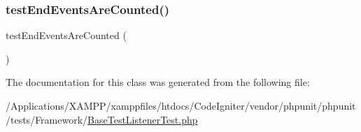 \subsubsection{\texorpdfstring{test\+End\+Events\+Are\+Counted()}{testEndEventsAreCounted()}}
{\footnotesize\ttfamily test\+End\+Events\+Are\+Counted (\begin{DoxyParamCaption}{ }\end{DoxyParamCaption})}



The documentation for this class was generated from the following file\+:\begin{DoxyCompactItemize}
\item 
/\+Applications/\+X\+A\+M\+P\+P/xamppfiles/htdocs/\+Code\+Igniter/vendor/phpunit/phpunit/tests/\+Framework/\mbox{\hyperlink{_base_test_listener_test_8php}{Base\+Test\+Listener\+Test.\+php}}\end{DoxyCompactItemize}
